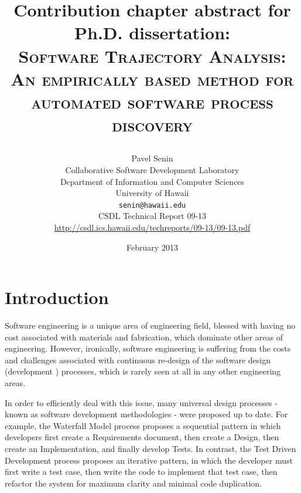 \documentclass[11pt,oneside]{article}
\numberwithin{equation}{subsection}
\begin{document}
\title{Contribution chapter abstract for Ph.D. dissertation: \\
       \textsc{Software Trajectory Analysis:} \\
       \textsc{An empirically based method for automated software process discovery} \\
       \author{Pavel Senin \\
               Collaborative Software Development Laboratory \\
               Department of Information and Computer Sciences \\
               University of Hawaii \\[0.3cm]
               \texttt{senin@hawaii.edu} \\[0.3cm]
               CSDL Technical Report 09-13 \\
               \url{http://csdl.ics.hawaii.edu/techreports/09-13/09-13.pdf}
       }
       \date{February 2013}
}
\maketitle

\clearpage


\section{Introduction}
Software engineering is a unique area of engineering field, blessed with having no cost 
associated with materials and fabrication, which dominate other areas of engineering. 
However, ironically, software engineering is suffering from the costs and challenges
associated with continuous re-design of the software design (development ) processes, 
which is rarely seen at all in any other engineering areas. 

In order to efficiently deal with this issue, many universal design processes - known as 
software development methodologies - were proposed up to date. 
For example, the Waterfall Model process proposes a sequential pattern in which developers 
first create a Requirements document, then create a Design, then create an Implementation, 
and finally develop Tests. 
In contrast, the Test Driven Development process proposes an iterative pattern,
in which the developer  must first write a test case, then write the code to implement 
that test case, then refactor  the system for maximum clarity and minimal code duplication.
\end{document}

